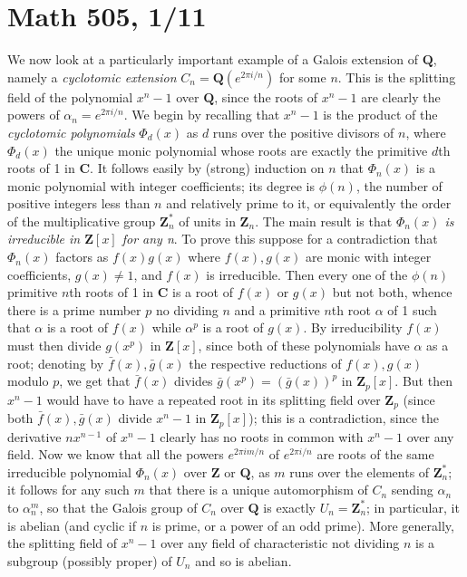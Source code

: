 \documentclass[10pt]{article}
\begin{document}
\section*{Math 505, 1/11}

We now look at a particularly important example of a Galois extension of
$\mathbf Q$, namely a {\sl cyclotomic extension} $C_n = \mathbf
Q(e^{2\pi i/n})$ for some $n$. This is the splitting field of the
polynomial $x^n - 1$ over $\mathbf Q$, since the roots of $x^n - 1$ are
clearly the powers of $\alpha_n = e^{2\pi i/n}$. We begin by recalling
that $x^n - 1$ is the product of the {\sl cyclotomic polynomials}
$\Phi_d(x)$ as $d$ runs over the positive divisors of $n$, where
$\Phi_d(x)$ the unique monic polynomial whose roots are exactly the
primitive $d$th roots of 1 in $\mathbf C$. It follows easily by (strong)
induction on $n$ that $\Phi_n(x)$ is a monic polynomial with integer
coefficients; its degree is $\phi(n)$, the number of positive integers
less than $n$ and relatively prime to it, or equivalently the order of
the multiplicative group $\mathbf Z_n^*$ of units in $\mathbf Z_n$. The
main result is that {\sl $\Phi_n(x)$ is irreducible in $\mathbf Z[x]$
  for any n}. To prove this suppose for a contradiction that $\Phi_n(x)$
factors as $f(x) g(x)$ where $f(x),g(x)$ are monic with integer
coefficients, $g(x)\ne1$, and $f(x)$ is irreducible. Then every one of
the $\phi(n)$ primitive $n$th roots of 1 in $\mathbf C$ is a root of
$f(x)$ or $g(x)$ but not both, whence there is a prime number $p$ no
dividing $n$ and a primitive $n$th root $\alpha$ of 1 such that $\alpha$
is a root of $f(x)$ while $\alpha^p$ is a root of $g(x)$. By
irreducibility $f(x)$ must then divide $g(x^p)$ in $\mathbf Z[x]$, since
both of these polynomials have $\alpha$ as a root; denoting by $\bar
f(x),\bar g(x)$ the respective reductions of $f(x),g(x)$ modulo $p$, we
get that $\bar f(x)$ divides $\bar g(x^p) = (\bar g(x))^p$ in $\mathbf
Z_p[x]$. But then $x^n - 1$ would have to have a repeated root in its
splitting field over $\mathbf Z_p$ (since both $\bar f(x),\bar g(x)$
divide $x^n - 1$ in $\mathbf Z_p[x]$); this is a contradiction, since
the derivative $nx^{n-1}$ of $x^n - 1$ clearly has no roots in common
with $x^n - 1$ over any field. Now we know that all the powers $e^{2\pi
  i m/n}$ of $e^{2\pi i/n}$ are roots of the same irreducible polynomial
$\Phi_n(x)$ over $\mathbf Z$ or $\mathbf Q$, as $m$ runs over the
elements of $\mathbf Z_n^*$; it follows for any such $m$ that there is a
unique automorphism of $C_n$ sending $\alpha_n$ to $\alpha_n^m$, so that
the Galois group of $C_n$ over $\mathbf Q$ is exactly $U_n = \mathbf
Z_n^*$; in particular, it is abelian (and cyclic if $n$ is prime, or a
power of an odd prime). More generally, the splitting field of $x^n - 1$
over any field of characteristic not dividing $n$ is a subgroup
(possibly proper) of $U_n$ and so is abelian.
\end{document}
